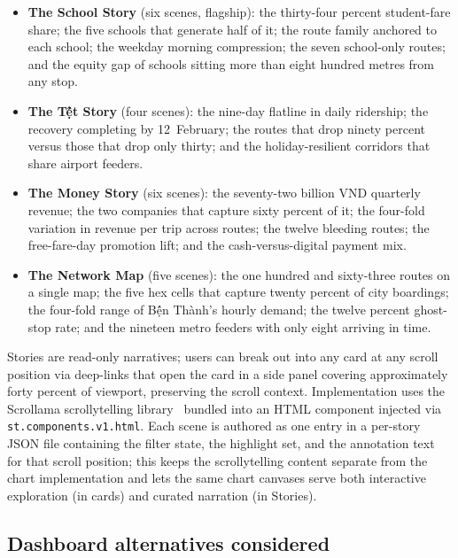 \begin{itemize}
\item \textbf{The School Story} (six scenes, flagship): the
    thirty-four percent student-fare share; the five schools
    that generate half of it; the route family anchored to each
    school; the weekday morning compression; the seven
    school-only routes; and the equity gap of schools sitting
    more than eight hundred metres from any stop.
\item \textbf{The T\d ết Story} (four scenes): the nine-day
    flatline in daily ridership; the recovery completing by
    12~February; the routes that drop ninety percent versus
    those that drop only thirty; and the holiday-resilient
    corridors that share airport feeders.
\item \textbf{The Money Story} (six scenes): the seventy-two
    billion VND quarterly revenue; the two companies that
    capture sixty percent of it; the four-fold variation in
    revenue per trip across routes; the twelve bleeding routes;
    the free-fare-day promotion lift; and the cash-versus-digital
    payment mix.
\item \textbf{The Network Map} (five scenes): the one hundred
    and sixty-three routes on a single map; the five hex cells
    that capture twenty percent of city boardings; the
    four-fold range of B\d ến Th\`anh's hourly demand; the
    twelve percent ghost-stop rate; and the nineteen metro
    feeders with only eight arriving in time.
\end{itemize}

Stories are read-only narratives; users can break out into any
card at any scroll position via deep-links that open the card
in a side panel covering approximately forty percent of viewport,
preserving the scroll context. Implementation uses the
Scrollama scrollytelling library~\cite{scrollama} bundled into
an HTML component injected via \texttt{st.components.v1.html}.
Each scene is authored as one entry in a per-story JSON file
containing the filter state, the highlight set, and the
annotation text for that scroll position; this keeps the
scrollytelling content separate from the chart implementation
and lets the same chart canvases serve both interactive
exploration (in cards) and curated narration (in Stories).

\subsection{Dashboard alternatives considered}
\label{sec:proposed:dashboard_alts}

